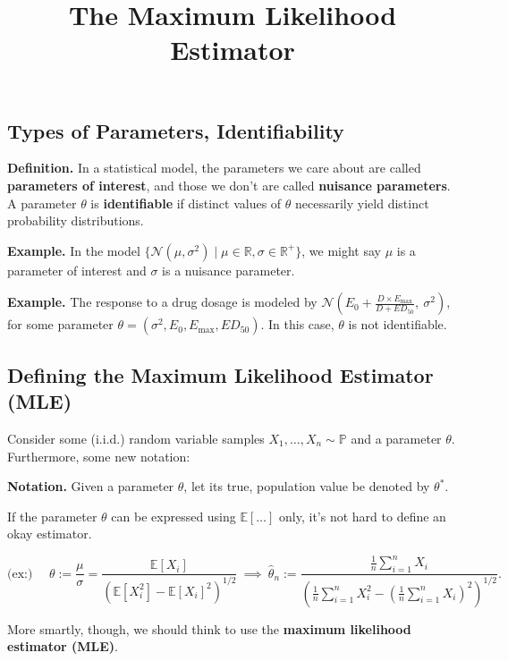 \title{The Maximum Likelihood Estimator}



\subsection{Types of Parameters, Identifiability}

\textbf{Definition.} In a statistical model,
the parameters we care about are called \textbf{parameters of interest},
and those we don't are called \textbf{nuisance parameters}.
A parameter $\theta$ is \textbf{identifiable} if
distinct values of $\theta$ necessarily yield distinct probability distributions.

\textbf{Example.} In the model
$\{\mathcal{N}(\mu, \sigma^2) \mid \mu \in \mathbb{R}, \sigma \in \mathbb{R}^+\}$,
we might say $\mu$ is a parameter of interest and $\sigma$ is a nuisance parameter.

\textbf{Example.} The response to a drug dosage is modeled by
$\mathcal{N}\left(E_0 + \frac{D \times E_{\text{max}}}{D + ED_{50}},\ \sigma^2\right)$,
for some parameter $\theta = (\sigma^2, E_0, E_{\text{max}}, ED_{50})$.
In this case, $\theta$ is not identifiable.

\subsection{Defining the Maximum Likelihood Estimator (MLE)}

Consider some (i.i.d.) random variable samples $X_1, \dots, X_n \sim \mathbb{P}$
and a parameter $\theta$.  Furthermore, some new notation:

\textbf{Notation.} Given a parameter $\theta$,
let its true, population value be denoted by $\theta^*$.

If the parameter $\theta$ can be expressed using $\mathbb{E}[\dots]$ only,
it's not hard to define an okay estimator.

\[ \text{(ex:)} ~~~~~~ \theta := \frac{\mu}{\sigma} =
\frac{\mathbb{E}[X_i]}{(\mathbb{E}[X_i^2] - \mathbb{E}[X_i]^2)^{1/2}} ~ \implies ~ \hat{\theta}_n :=
\frac{\frac{1}{n}\sum_{i = 1}^n X_i}{\left(
\frac{1}{n}\sum_{i = 1}^n X_i^2 - \left(\frac{1}{n}\sum_{i = 1}^n X_i\right)^2
\right)^{1/2}}. \]

More smartly, though, we should think to use the \textbf{maximum likelihood estimator (MLE)}.

